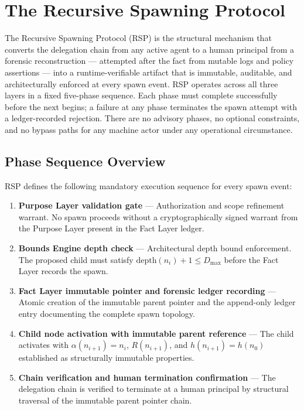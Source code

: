 \section{The Recursive Spawning Protocol}
\label{sec:rs-protocol}

The Recursive Spawning Protocol (RSP) is the structural mechanism that converts the delegation chain from any active agent to a human principal from a forensic reconstruction — attempted after the fact from mutable logs and policy assertions — into a runtime-verifiable artifact that is immutable, auditable, and architecturally enforced at every spawn event. RSP operates across all three \bxthree{} layers in a fixed five-phase sequence. Each phase must complete successfully before the next begins; a failure at any phase terminates the spawn attempt with a ledger-recorded rejection. There are no advisory phases, no optional constraints, and no bypass paths for any machine actor under any operational circumstance.

\subsection{Phase Sequence Overview}

RSP defines the following mandatory execution sequence for every spawn event:

\begin{enumerate}
    \item \textbf{Purpose Layer validation gate} — Authorization and scope refinement warrant. No spawn proceeds without a cryptographically signed warrant from the Purpose Layer present in the Fact Layer ledger.
    \item \textbf{Bounds Engine depth check} — Architectural depth bound enforcement. The proposed child must satisfy $\text{depth}(n_i) + 1 \leq D_{\max}$ before the Fact Layer records the spawn.
    \item \textbf{Fact Layer immutable pointer and forensic ledger recording} — Atomic creation of the immutable parent pointer and the append-only ledger entry documenting the complete spawn topology.
    \item \textbf{Child node activation with immutable parent reference} — The child activates with $\alpha(n_{i+1}) = n_i$, $R(n_{i+1})$, and $h(n_{i+1}) = h(n_0)$ established as structurally immutable properties.
    \item \textbf{Chain verification and human termination confirmation} — The delegation chain is verified to terminate at a human principal by structural traversal of the immutable parent pointer chain.
\end{enumerate}


